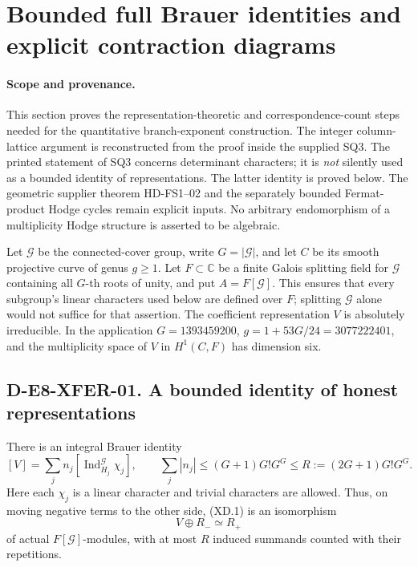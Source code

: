 \section{Bounded full Brauer identities and explicit contraction diagrams}
\label{sec:e8-transfer-diagrams}

\paragraph{Scope and provenance.}
This section proves the representation-theoretic and correspondence-count
steps needed for the quantitative branch-exponent construction.  The
integer column-lattice argument is reconstructed from the proof inside
the supplied SQ3.  The printed statement of SQ3 concerns determinant
characters; it is \emph{not} silently used as a bounded identity of
representations.  The latter identity is proved below.  The geometric
supplier theorem HD-FS1--02 and the separately bounded Fermat-product
Hodge cycles remain explicit inputs.  No arbitrary endomorphism of a
multiplicity Hodge structure is asserted to be algebraic.

Let \(\mathcal G\) be the connected-cover group, write \(G=|\mathcal G|\),
and let \(C\) be its smooth projective curve of genus \(g\geq1\).
Let \(F\subset\mathbb C\) be a finite Galois splitting field for
\(\mathcal G\) containing all \(G\)-th roots of unity, and put
\(A=F[\mathcal G]\).  This ensures that every subgroup's linear
characters used below are defined over \(F\); splitting
\(\mathcal G\) alone would not suffice for that assertion.
The coefficient representation \(V\) is absolutely irreducible.
In the application \(G=1393459200\), \(g=1+53G/24=3077222401\),
and the multiplicity space of \(V\) in \(H^1(C,F)\) has dimension six.

\subsection*{D-E8-XFER-01. A bounded identity of honest representations}

There is an integral Brauer identity
\[
 [V]=\sum_j n_j[\operatorname{Ind}_{H_j}^{\mathcal G}\chi_j],
 \qquad
 \sum_j|n_j|\leq (G+1)G!G^G
 \leq R:=(2G+1)G!G^G.                                  \tag{XD.1}
\]
Here each \(\chi_j\) is a linear character and trivial characters are
allowed.  Thus, on moving negative terms to the other side, (XD.1)
is an isomorphism
\[
 V\oplus R_-\simeq R_+                                   \tag{XD.2}
\]
of actual \(F[\mathcal G]\)-modules, with at most \(R\) induced
summands counted with their repetitions.


